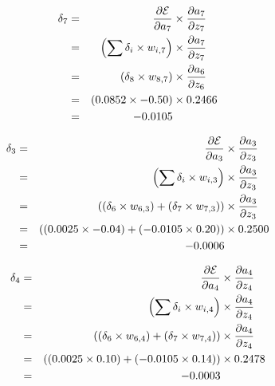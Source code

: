 \documentclass[xcolor={table}]{beamer}
\begin{document}
 \begin{frame} 
\begin{alignat}{3}
\delta_7 & = & \frac{\partial \mathcal{E}}{\partial a_7} &\times \frac{\partial a_7}{\partial z_7} \notag\\
& = & \left(\sum \delta_i \times w_{i,7}\right) &\times \frac{\partial a_7}{\partial z_7} \notag\\
& = & \left(\delta_8 \times w_{8,7}\right) &\times \frac{\partial a_6}{\partial z_6} \notag\\
& = & \left(0.0852 \times {-0.50}\right) &\times 0.2466 \notag\\
& = & {-0.0105}
\label{eq:delta7}
\end{alignat}
\end{frame} 



 \begin{frame} 
\begin{alignat}{3}
\delta_3 & = & \frac{\partial \mathcal{E}}{\partial a_3} &\times \frac{\partial a_3}{\partial z_3} \notag\\
& = & \left(\sum \delta_i \times w_{i,3}\right) &\times \frac{\partial a_3}{\partial z_3} \notag\\
& = & \left(\left(\delta_6 \times w_{6,3}\right) + \left(\delta_7 \times w_{7,3}\right) \right) &\times \frac{\partial a_3}{\partial z_3} \notag\\
& = & \left(\left(0.0025 \times -0.04\right) + \left({-0.0105} \times 0.20\right) \right) &\times 0.2500\notag\\
& = & {-0.0006}
\label{eq:delta3}
\end{alignat}
\end{frame} 



 \begin{frame} 
\begin{alignat}{3}
\delta_4 & = & \frac{\partial \mathcal{E}}{\partial a_4} &\times \frac{\partial a_4}{\partial z_4} \notag\\
& = & \left(\sum \delta_i \times w_{i,4}\right) &\times \frac{\partial a_4}{\partial z_4} \notag\\
& = & \left(\left(\delta_6 \times w_{6,4}\right) + \left(\delta_7 \times w_{7,4}\right) \right) &\times \frac{\partial a_4}{\partial z_4} \notag\\
& = & \left(\left(0.0025 \times 0.10\right) + \left({-0.0105} \times 0.14\right) \right) &\times 0.2478\notag\\
& = & {-0.0003}
\label{eq:delta4}
\end{alignat}
\end{frame} 
\end{document}

